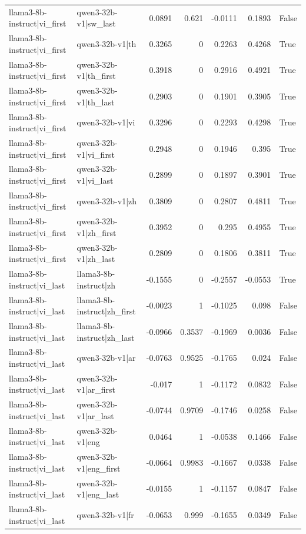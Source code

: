 \begin{table}
\begin{tabular}{l l r r r r l}
llama3-8b-instruct|vi_first & qwen3-32b-v1|sw_last & 0.0891 & 0.621 & -0.0111 & 0.1893 & False \\
llama3-8b-instruct|vi_first & qwen3-32b-v1|th & 0.3265 & 0 & 0.2263 & 0.4268 & True \\
llama3-8b-instruct|vi_first & qwen3-32b-v1|th_first & 0.3918 & 0 & 0.2916 & 0.4921 & True \\
llama3-8b-instruct|vi_first & qwen3-32b-v1|th_last & 0.2903 & 0 & 0.1901 & 0.3905 & True \\
llama3-8b-instruct|vi_first & qwen3-32b-v1|vi & 0.3296 & 0 & 0.2293 & 0.4298 & True \\
llama3-8b-instruct|vi_first & qwen3-32b-v1|vi_first & 0.2948 & 0 & 0.1946 & 0.395 & True \\
llama3-8b-instruct|vi_first & qwen3-32b-v1|vi_last & 0.2899 & 0 & 0.1897 & 0.3901 & True \\
llama3-8b-instruct|vi_first & qwen3-32b-v1|zh & 0.3809 & 0 & 0.2807 & 0.4811 & True \\
llama3-8b-instruct|vi_first & qwen3-32b-v1|zh_first & 0.3952 & 0 & 0.295 & 0.4955 & True \\
llama3-8b-instruct|vi_first & qwen3-32b-v1|zh_last & 0.2809 & 0 & 0.1806 & 0.3811 & True \\
llama3-8b-instruct|vi_last & llama3-8b-instruct|zh & -0.1555 & 0 & -0.2557 & -0.0553 & True \\
llama3-8b-instruct|vi_last & llama3-8b-instruct|zh_first & -0.0023 & 1 & -0.1025 & 0.098 & False \\
llama3-8b-instruct|vi_last & llama3-8b-instruct|zh_last & -0.0966 & 0.3537 & -0.1969 & 0.0036 & False \\
llama3-8b-instruct|vi_last & qwen3-32b-v1|ar & -0.0763 & 0.9525 & -0.1765 & 0.024 & False \\
llama3-8b-instruct|vi_last & qwen3-32b-v1|ar_first & -0.017 & 1 & -0.1172 & 0.0832 & False \\
llama3-8b-instruct|vi_last & qwen3-32b-v1|ar_last & -0.0744 & 0.9709 & -0.1746 & 0.0258 & False \\
llama3-8b-instruct|vi_last & qwen3-32b-v1|eng & 0.0464 & 1 & -0.0538 & 0.1466 & False \\
llama3-8b-instruct|vi_last & qwen3-32b-v1|eng_first & -0.0664 & 0.9983 & -0.1667 & 0.0338 & False \\
llama3-8b-instruct|vi_last & qwen3-32b-v1|eng_last & -0.0155 & 1 & -0.1157 & 0.0847 & False \\
llama3-8b-instruct|vi_last & qwen3-32b-v1|fr & -0.0653 & 0.999 & -0.1655 & 0.0349 & False \\

\end{tabular}
\end{table}
